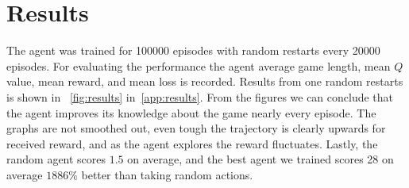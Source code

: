 \section{Results}
The agent was trained for 100000 episodes with random restarts every 20000 episodes. For evaluating the performance the agent average game length, mean \(Q\) value, mean reward, and mean loss is recorded. Results from one random restarts is shown in ~\autoref{fig:results} in~\autoref{app:results}. From the figures we can conclude that the agent improves its knowledge about the game nearly every episode. The graphs are not smoothed out, even tough the trajectory is clearly upwards for received reward, and as the agent explores the reward fluctuates. Lastly, the random agent scores \(1.5\) on average, and the best agent we trained scores 28 on average \(1886\%\) better than taking random actions.
